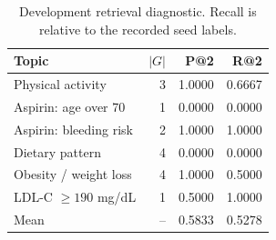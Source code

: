\begin{table}[t]
\centering
\caption{Development retrieval diagnostic. Recall is relative to the recorded seed labels.}
\label{tab:retrieval}
\small
\begin{tabular}{lrrr}
\toprule
Topic & $|G|$ & P@2 & R@2 \\
\midrule
Physical activity & 3 & 1.0000 & 0.6667 \\
Aspirin: age over 70 & 1 & 0.0000 & 0.0000 \\
Aspirin: bleeding risk & 2 & 1.0000 & 1.0000 \\
Dietary pattern & 4 & 0.0000 & 0.0000 \\
Obesity / weight loss & 4 & 1.0000 & 0.5000 \\
LDL-C $\geq190$ mg/dL & 1 & 0.5000 & 1.0000 \\
Mean & -- & 0.5833 & 0.5278 \\
\bottomrule
\end{tabular}
\end{table}
